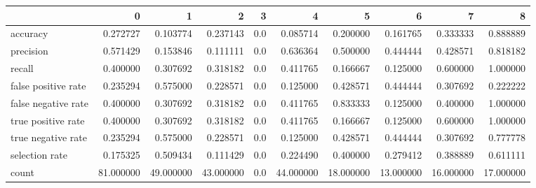 \begin{tabular}{lrrrrrrrrr}
\toprule
{} &          0 &          1 &          2 &    3 &          4 &          5 &          6 &          7 &          8 \\
\midrule
accuracy            &   0.272727 &   0.103774 &   0.237143 &  0.0 &   0.085714 &   0.200000 &   0.161765 &   0.333333 &   0.888889 \\
precision           &   0.571429 &   0.153846 &   0.111111 &  0.0 &   0.636364 &   0.500000 &   0.444444 &   0.428571 &   0.818182 \\
recall              &   0.400000 &   0.307692 &   0.318182 &  0.0 &   0.411765 &   0.166667 &   0.125000 &   0.600000 &   1.000000 \\
false positive rate &   0.235294 &   0.575000 &   0.228571 &  0.0 &   0.125000 &   0.428571 &   0.444444 &   0.307692 &   0.222222 \\
false negative rate &   0.400000 &   0.307692 &   0.318182 &  0.0 &   0.411765 &   0.833333 &   0.125000 &   0.400000 &   1.000000 \\
true positive rate  &   0.400000 &   0.307692 &   0.318182 &  0.0 &   0.411765 &   0.166667 &   0.125000 &   0.600000 &   1.000000 \\
true negative rate  &   0.235294 &   0.575000 &   0.228571 &  0.0 &   0.125000 &   0.428571 &   0.444444 &   0.307692 &   0.777778 \\
selection rate      &   0.175325 &   0.509434 &   0.111429 &  0.0 &   0.224490 &   0.400000 &   0.279412 &   0.388889 &   0.611111 \\
count               &  81.000000 &  49.000000 &  43.000000 &  0.0 &  44.000000 &  18.000000 &  13.000000 &  16.000000 &  17.000000 \\
\bottomrule
\end{tabular}
